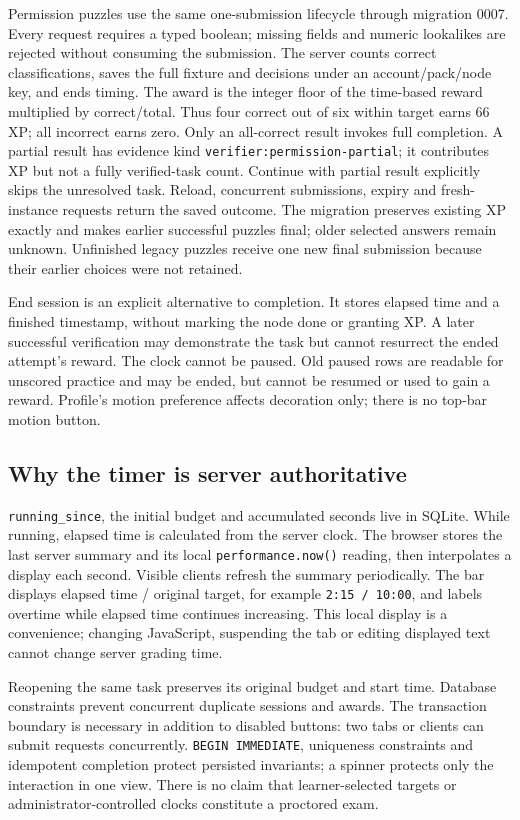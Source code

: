 Permission puzzles use the same one-submission lifecycle through migration 0007.
Every request requires a typed boolean; missing fields and numeric lookalikes are
rejected without consuming the submission. The server counts correct classifications,
saves the full fixture and decisions under an account/pack/node key, and ends timing.
The award is the integer floor of the time-based reward multiplied by correct/total.
Thus four correct out of six within target earns 66 XP; all incorrect earns zero.
Only an all-correct result invokes full completion. A partial result has evidence kind
\texttt{verifier:permission-partial}; it contributes XP but not a fully verified-task
count. Continue with partial result explicitly skips the unresolved task. Reload,
concurrent submissions, expiry and fresh-instance requests return the saved outcome.
The migration preserves existing XP exactly and makes earlier successful puzzles
final; older selected answers remain unknown. Unfinished legacy puzzles receive one
new final submission because their earlier choices were not retained.

End session is an explicit alternative to completion. It stores elapsed time and a
finished timestamp, without marking the node done or granting XP. A later successful
verification may demonstrate the task but cannot resurrect the ended attempt's
reward. The clock cannot be paused. Old paused rows are readable for unscored
practice and may be ended, but cannot be resumed or used to gain a reward. Profile's
motion preference affects decoration only; there is no top-bar motion button.

\subsection{Why the timer is server authoritative}
\texttt{running\_since}, the initial budget and accumulated seconds live in SQLite.
While running, elapsed time is calculated from the server clock. The browser stores
the last server summary and its local \texttt{performance.now()} reading, then
interpolates a display each second. Visible clients refresh the summary periodically.
The bar displays elapsed time / original target, for example \texttt{2:15 / 10:00},
and labels overtime while elapsed time continues increasing. This local display
is a convenience; changing JavaScript, suspending the tab or
editing displayed text cannot change server grading time.

Reopening the same task preserves its original budget and start time. Database
constraints prevent concurrent duplicate sessions and awards. The transaction
boundary is necessary in addition to disabled buttons: two tabs or clients can
submit requests concurrently. \texttt{BEGIN IMMEDIATE}, uniqueness constraints and
idempotent completion protect persisted invariants; a spinner protects only the
interaction in one view. There is no claim that learner-selected targets or
administrator-controlled clocks constitute a proctored exam.

